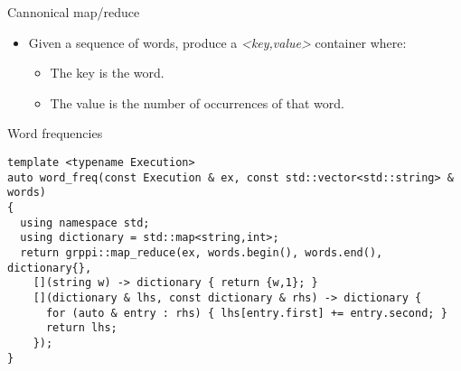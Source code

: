 \begin{frame}[t,fragile]{Cannonical map/reduce}
\begin{itemize}
  \item Given a sequence of words, produce a \emph{<key,value>} container where:
    \begin{itemize}
      \item The key is the word.
      \item The value is the number of occurrences of that word.
    \end{itemize}
\end{itemize}
\vfill\pause
\begin{block}{Word frequencies}
\begin{lstlisting}
template <typename Execution>
auto word_freq(const Execution & ex, const std::vector<std::string> & words)
{
  using namespace std;
  using dictionary = std::map<string,int>;
  return grppi::map_reduce(ex, words.begin(), words.end(), dictionary{},
    [](string w) -> dictionary { return {w,1}; }
    [](dictionary & lhs, const dictionary & rhs) -> dictionary {
      for (auto & entry : rhs) { lhs[entry.first] += entry.second; }
      return lhs;
    });
}
\end{lstlisting}
\end{block}
\end{frame}
